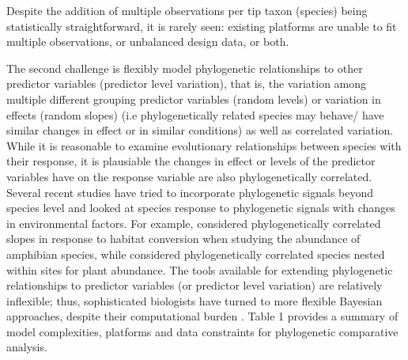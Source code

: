 Despite the addition of multiple observations per tip taxon (species) being statistically straightforward, it is rarely seen: existing platforms are unable to fit multiple observations, or unbalanced design data, or both.


The second challenge is flexibly model phylogenetic relationships to other predictor variables (predictor level variation), that is, the variation among multiple different grouping predictor variables (random levels) or variation in effects (random slopes) (i.e phylogenetically related species may behave/ have similar changes in effect or in similar conditions) as well as correlated variation.
While it is reasonable to examine evolutionary relationships between species with their response, it is plausiable the changes in effect or levels of the predictor variables have on the response variable are also phylogenetically correlated. 
Several recent studies have tried to incorporate phylogenetic signals beyond species level and looked at species response to phylogenetic signals with changes in environmental factors.
For example, \cite{nowakowski2018phylogenetic} considered phylogenetically correlated slopes in response to habitat conversion when studying the abundance of amphibian species, while \cite{li2017canfun} considered phylogenetically correlated species nested within sites for plant abundance. 
The tools available for extending phylogenetic relationships to predictor variables (or predictor level variation) are relatively inflexible; thus, sophisticated biologists have turned to more flexible Bayesian approaches, despite their computational burden \cite{hadfield2010mcmc, burkner2016brms}.
Table 1 provides a summary of model complexities, platforms and data constraints for phylogenetic comparative analysis.

